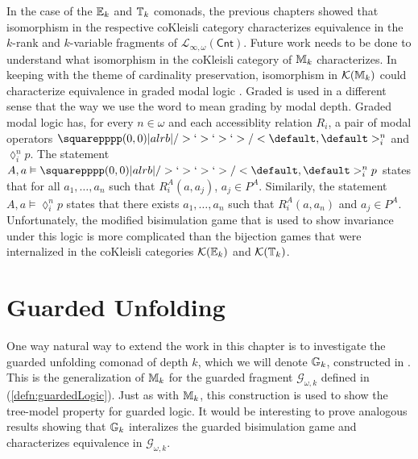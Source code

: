\begin{rmrk}
In the case of the ${\mathbb{E}_{k}}$  and ${\mathbb{T}_{k}}$ comonads, the previous chapters showed that isomorphism in the respective coKleisli category characterizes equivalence in the $k$-rank and $k$-variable fragments of $\mathcal{L}_{\infty,\omega}(\mathsf{Cnt})$. Future work needs to be done to understand what isomorphism in the coKleisli category of ${\mathbb{M}_{k}}$ characterizes. In keeping with the theme of cardinality preservation, isomorphism in $\mathcal{K}({\mathbb{M}_{k}})$ could characterize equivalence in graded modal logic \cite{Rijke2000}. Graded is used in a different sense that the way we use the word to mean grading by modal depth. Graded modal logic has, for every $n \in \omega$ and each accessiblity relation $R_{i}$, a pair of modal operators $\amssquare_{i}^{n}$ and $\lozenge_{i}^{n}p$. The statement $A,a \vDash \amssquare_{i}^{n}p$ states that for all $a_{1},\dots,a_{n}$ such that $R^{A}_{i}(a,a_{j})$, $a_{j} \in P^{A}$. Similarily, the statement $A,a \vDash \lozenge_{i}^{n}p$ states that there exists $a_{1},\dots,a_{n}$ such that $R^{A}_{i}(a,a_{n})$ and $a_{j} \in P^{A}$. Unfortunately, the modified bisimulation game that is used to show invariance under this logic is more complicated than the bijection games that were internalized in the coKleisli categories $\mathcal{K}({\mathbb{E}_{k}})$ and $\mathcal{K}({\mathbb{T}_{k}})$.
\end{rmrk}
\section{Guarded Unfolding}
One way natural way to extend the work in this chapter is to investigate the guarded unfolding comonad of depth $k$, which we will denote ${\mathbb{G}_{k}}$, constructed in \cite{Gradel2014}. This is the generalization of ${\mathbb{M}_{k}}$ for the guarded fragment $\mathcal{G}_{\omega,k}$ defined in (\ref{defn:guardedLogic}). Just as with ${\mathbb{M}_{k}}$, this construction is used to show the tree-model property for guarded logic. It would be interesting to prove analogous results showing that ${\mathbb{G}_{k}}$ interalizes the guarded bisimulation game and characterizes equivalence in $\mathcal{G}_{\omega,k}$. 
